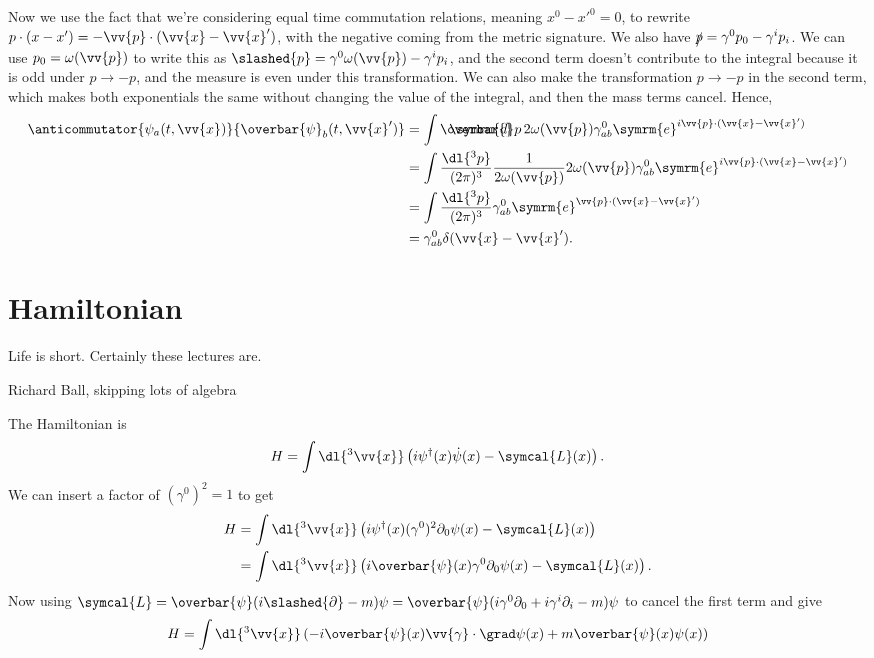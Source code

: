 \documentclass[fleqn]{NotesClass}
\newcommand{\e}{\symrm{e}}
\newcommand{\lagrangianDensity}{\symcal{L}}
\newcommand{\hermit}{{\dagger}}
\newcommand{\dbar}[1][0.0]{\ThisStyle{\ensurestackMath{%
            \stackengine{#1\LMex}{\SavedStyle \symrm{d}}{\SavedStyle\overbar{}%
                \mkern2.25mu}{O}{r}{F}{F}{L}}}}
\newcommand{\invariantmeasure}[1]{%
    \mathchoice{\dbar #1}{\dbar #1}{\dbar[.05] #1}{\dbar[.06] #1}
}
\newcommand{\diracadjoint}[1]{\overbar{#1}}
\begin{document}
    Now we use the fact that we're considering equal time commutation relations, meaning \(x^0 - x'^0 = 0\), to rewrite \(p \cdot (x - x') = -\vv{p} \cdot (\vv{x} - \vv{x}')\), with the negative coming from the metric signature.
    We also have \(\slashed{p} = \gamma^0p_0 - \gamma^ip_i\).
    We can use \(p_0 = \omega(\vv{p})\) to write this as \(\slashed{p} = \gamma^0\omega(\vv{p}) - \gamma^ip_i\), and the second term doesn't contribute to the integral because it is odd under \(p \to -p\), and the measure is even under this transformation.
    We can also make the transformation \(p \to -p\) in the second term, which makes both exponentials the same without changing the value of the integral, and then the mass terms cancel.
    Hence,
    \begin{align}
        \anticommutator{\psi_a(t, \vv{x})}{\diracadjoint{\psi}_b(t, \vv{x}')} &= \int \invariantmeasure{p} \, 2\omega(\vv{p}) \gamma^0_{ab} \e^{i\vv{p} \cdot (\vv{x} - \vv{x}')}\\
        &= \int \frac{\dl{^3p}}{(2\pi)^3}\frac{1}{2\omega(\vv{p})} 2\omega(\vv{p}) \gamma^0_{ab} \e^{i\vv{p} \cdot (\vv{x} - \vv{x}')}\\
        &= \int \frac{\dl{^3p}}{(2\pi)^3} \gamma^0_{ab} \e^{\vv{p} \cdot (\vv{x} - \vv{x}')}\\
        &= \gamma^0_{ab} \delta(\vv{x} - \vv{x}').
    \end{align}
    
    \section{Hamiltonian}
    \epigraph{Life is short. Certainly these lectures are.}{Richard Ball, skipping lots of algebra}
    
    The Hamiltonian is
    \begin{equation}
        H = \int \dl{^3\vv{x}} \left( i \psi^\hermit(x) \dot{\psi}(x) - \lagrangianDensity(x) \right).
    \end{equation}
    We can insert a factor of \((\gamma^0)^2 = 1\) to get
    \begin{align}
        H &= \int \dl{^3\vv{x}} \left( i \psi^\hermit(x) (\gamma^0)^2 \partial_0 \psi(x) - \lagrangianDensity(x) \right)\\
        &= \int \dl{^3\vv{x}} \left( i \diracadjoint{\psi}(x) \gamma^0 \partial_0 \psi(x) - \lagrangianDensity(x) \right).
    \end{align}
    Now using \(\lagrangianDensity = \diracadjoint{\psi}(i\slashed{\partial} - m)\psi = \diracadjoint{\psi}(i\gamma^0\partial_0 + i\gamma^i\partial_i - m)\psi\) to cancel the first term and give
    \begin{equation}
        H = \int \dl{^3\vv{x}} \left( -i\diracadjoint{\psi}(x) \vv{\gamma} \cdot \grad \psi(x) + m \diracadjoint{\psi}(x)\psi(x) \right)
    \end{equation}
    
\end{document}
